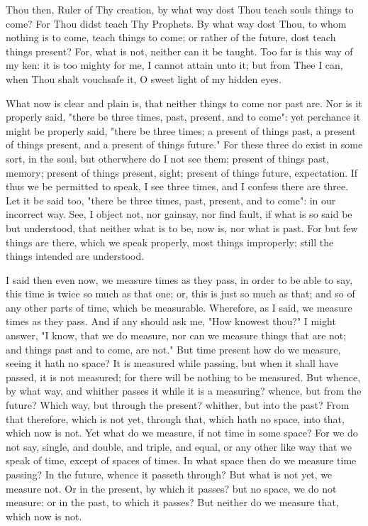 \documentclass[b5paper,openright,12pt,twoside]{book}
\begin{document}
Thou then, Ruler of Thy creation, by what way dost Thou teach souls
things to come? For Thou didst teach Thy Prophets. By what way dost
Thou, to whom nothing is to come, teach things to come; or rather of the
future, dost teach things present? For, what is not, neither can it be
taught. Too far is this way of my ken: it is too mighty for me, I cannot
attain unto it; but from Thee I can, when Thou shalt vouchsafe it, O
sweet light of my hidden eyes.

What now is clear and plain is, that neither things to come nor past
are. Nor is it properly said, "there be three times, past, present,
and to come": yet perchance it might be properly said, "there be three
times; a present of things past, a present of things present, and a
present of things future." For these three do exist in some sort, in the
soul, but otherwhere do I not see them; present of things past, memory;
present of things present, sight; present of things future, expectation.
If thus we be permitted to speak, I see three times, and I confess there
are three. Let it be said too, "there be three times, past, present, and
to come": in our incorrect way. See, I object not, nor gainsay, nor find
fault, if what is so said be but understood, that neither what is to be,
now is, nor what is past. For but few things are there, which we
speak properly, most things improperly; still the things intended are
understood.

I said then even now, we measure times as they pass, in order to be able
to say, this time is twice so much as that one; or, this is just so
much as that; and so of any other parts of time, which be measurable.
Wherefore, as I said, we measure times as they pass. And if any should
ask me, "How knowest thou?" I might answer, "I know, that we do measure,
nor can we measure things that are not; and things past and to come, are
not." But time present how do we measure, seeing it hath no space? It
is measured while passing, but when it shall have passed, it is not
measured; for there will be nothing to be measured. But whence, by what
way, and whither passes it while it is a measuring? whence, but from the
future? Which way, but through the present? whither, but into the past?
From that therefore, which is not yet, through that, which hath no
space, into that, which now is not. Yet what do we measure, if not time
in some space? For we do not say, single, and double, and triple, and
equal, or any other like way that we speak of time, except of spaces
of times. In what space then do we measure time passing? In the future,
whence it passeth through? But what is not yet, we measure not. Or in
the present, by which it passes? but no space, we do not measure: or in
the past, to which it passes? But neither do we measure that, which now
is not.
\end{document}
